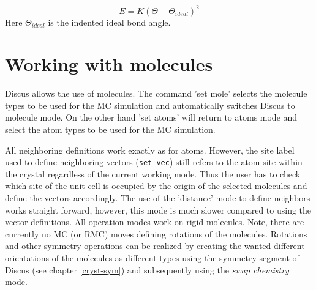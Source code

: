 \begin{equation}
  E = K \left (\Theta - \Theta_{ideal} \right )^2
\end{equation}
Here $\Theta_{ideal}$ is the indented ideal bond angle.


\section{Working with molecules \label{mc-mol}}

Discus allows the use of molecules. The command 'set mole'
selects the molecule types to be used for the MC simulation and
automatically switches Discus to molecule mode. On the other
hand 'set atoms' will return to atoms mode and select the atom
types to be used for the MC simulation. \par

All neighboring definitions work exactly as for atoms. However, the
site label used to define neighboring vectors ({\tt set vec}) still
refers to the atom site within the crystal regardless of the current
working mode.  Thus the user has to check which site of the unit
cell is occupied by the origin of the selected molecules and define
the vectors accordingly.  The use of the 'distance' mode to define
neighbors works straight forward, however, this mode is much slower
compared to using the vector definitions. All operation modes work
on rigid molecules.  Note, there are currently no MC (or RMC) moves
defining rotations of the molecules.  Rotations and other symmetry
operations can be realized by creating the wanted different
orientations of the molecules as different types using the symmetry
segment of Discus (see chapter \ref{cryst-sym}) and
subsequently using the {\it swap chemistry} mode.
